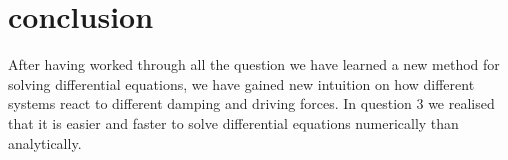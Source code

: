 \section{conclusion}
After having worked through all the question we have learned a new method for solving differential equations, we have gained new intuition on how different systems react to different damping and driving forces. In question 3 we realised that it is easier and faster to solve differential equations numerically than analytically.